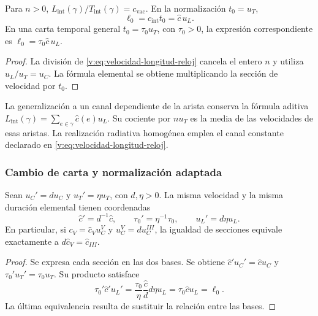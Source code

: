\begin{corollary}
\label{v:cor:longitud-elemental-constitutiva}
Para $n>0$, $L_{\mathrm{int}}(\gamma)/T_{\mathrm{int}}(\gamma)
=c_{\mathrm{vac}}$. En la normalización $t_0=u_T$,
\begin{equation}
 \ell_0=c_{\mathrm{int}}t_0=\widehat c\,u_L.
 \label{v:eq:longitud-elemental-constitutiva}
\end{equation}
En una carta temporal general $t_0=\tau_0u_T$, con $\tau_0>0$,
la expresión correspondiente es $\ell_0=\tau_0\widehat c\,u_L$.
\end{corollary}
\begin{proof}
La división de \eqref{v:eq:velocidad-longitud-reloj} cancela el entero
$n$ y utiliza $u_L/u_T=u_C$. La fórmula elemental se obtiene
multiplicando la sección de velocidad por $t_0$.
\end{proof}

La generalización a un canal dependiente de la arista conserva la fórmula
aditiva $L_{\mathrm{int}}(\gamma)=\sum_{e\in\gamma}\widehat c(e)u_L$.
Su cociente por $nu_T$ es la media de las velocidades de esas aristas.
La realización radiativa homogénea emplea el canal constante declarado
en \eqref{v:eq:velocidad-longitud-reloj}.

\subsubsection{Cambio de carta y normalización adaptada}

\begin{proposition}
\label{v:prop:covariancia-identidad-velocidad}
Sean $u_C'=d u_C$ y $u_T'=\eta u_T$, con $d,\eta>0$.
La misma velocidad y la misma duración elemental tienen coordenadas
\begin{equation}
 \widehat c'=d^{-1}\widehat c,
 \qquad \tau_0'=\eta^{-1}\tau_0,
 \qquad u_L'=d\eta u_L.
 \label{v:eq:velocidad-cambio-carta}
\end{equation}
En particular, si $c_V=\widehat c_Vu_C^V$ y
$u_C^V=d u_C^{III}$, la igualdad de secciones equivale exactamente a
$d\widehat c_V=\widehat c_{III}$.
\end{proposition}
\begin{proof}
Se expresa cada sección en las dos bases. Se obtiene
$\widehat c'u_C'=\widehat c u_C$ y
$\tau_0'u_T'=\tau_0u_T$. Su producto satisface
\[
 \tau_0'\widehat c' u_L'
 =\frac{\tau_0}{\eta}\frac{\widehat c}{d}
       d\eta u_L
 =\tau_0\widehat c u_L=\ell_0.
\]
La última equivalencia resulta de sustituir la relación entre las bases.
\end{proof}

